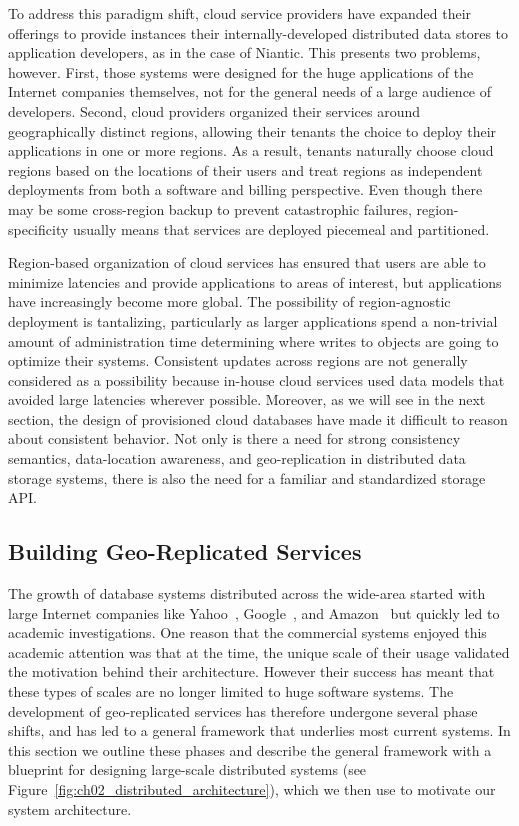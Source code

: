 To address this paradigm shift, cloud service providers have expanded their offerings to provide instances their internally-developed distributed data stores to application developers, as in the case of Niantic.
This presents two problems, however.
First, those systems were designed for the huge applications of the Internet companies themselves, not for the general needs of a large audience of developers.
Second, cloud providers organized their services around geographically distinct regions, allowing their tenants the choice to deploy their applications in one or more regions.
As a result, tenants naturally choose cloud regions based on the locations of their users and treat regions as independent deployments from both a software and billing perspective.
Even though there may be some cross-region backup to prevent catastrophic failures, region-specificity usually means that services are deployed piecemeal and partitioned.

Region-based organization of cloud services has ensured that users are able to minimize latencies and provide applications to areas of interest, but applications have increasingly become more global.
The possibility of region-agnostic deployment is tantalizing, particularly as larger applications spend a non-trivial amount of administration time determining where writes to objects are going to optimize their systems.
Consistent updates across regions are not generally considered as a possibility because in-house cloud services used data models that avoided large latencies wherever possible.
Moreover, as we will see in the next section, the design of provisioned cloud databases have made it difficult to reason about consistent behavior.
Not only is there a need for strong consistency semantics, data-location awareness, and geo-replication in distributed data storage systems, there is also the need for a familiar and standardized storage API.

\subsection{Building Geo-Replicated Services}
\label{ch02_systems_background}

The growth of database systems distributed across the wide-area started with large Internet companies like Yahoo~\cite{pnuts}, Google~\cite{bigtable}, and Amazon~\cite{dynamo} but quickly led to academic investigations.
One reason that the commercial systems enjoyed this academic attention was that at the time, the unique scale of their usage validated the motivation behind their architecture.
However their success has meant that these types of scales are no longer limited to huge software systems.
The development of geo-replicated services has therefore undergone several phase shifts, and has led to a general framework that underlies most current systems.
In this section we outline these phases and describe the general framework with a blueprint for designing large-scale distributed systems (see Figure~\ref{fig:ch02_distributed_architecture}), which we then use to motivate our system architecture.

